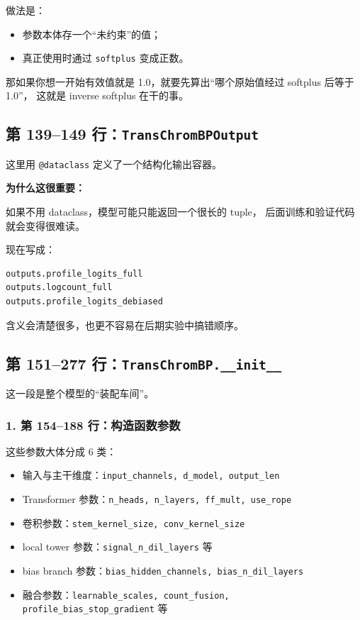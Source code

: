 \documentclass[11pt,a4paper]{ctexart}
\begin{document}
做法是：

\begin{itemize}[leftmargin=2em]
\item 参数本体存一个“未约束”的值；
\item 真正使用时通过 \texttt{softplus} 变成正数。
\end{itemize}

那如果你想一开始有效值就是 1.0，就要先算出“哪个原始值经过 softplus 后等于 1.0”，
这就是 inverse softplus 在干的事。

\subsection{第 139--149 行：\texttt{TransChromBPOutput}}

这里用 \texttt{@dataclass} 定义了一个结构化输出容器。

\textbf{为什么这很重要：}

如果不用 dataclass，模型可能只能返回一个很长的 tuple，
后面训练和验证代码就会变得很难读。

现在写成：

\begin{lstlisting}[language=Python]
outputs.profile_logits_full
outputs.logcount_full
outputs.profile_logits_debiased
\end{lstlisting}

含义会清楚很多，也更不容易在后期实验中搞错顺序。

\subsection{第 151--277 行：\texttt{TransChromBP.\_\_init\_\_}}

这一段是整个模型的“装配车间”。

\subsubsection*{1. 第 154--188 行：构造函数参数}

这些参数大体分成 6 类：

\begin{itemize}[leftmargin=2em]
\item 输入与主干维度：\texttt{input\_channels, d\_model, output\_len}
\item Transformer 参数：\texttt{n\_heads, n\_layers, ff\_mult, use\_rope}
\item 卷积参数：\texttt{stem\_kernel\_size, conv\_kernel\_size}
\item local tower 参数：\texttt{signal\_n\_dil\_layers} 等
\item bias branch 参数：\texttt{bias\_hidden\_channels, bias\_n\_dil\_layers}
\item 融合参数：\texttt{learnable\_scales, count\_fusion, profile\_bias\_stop\_gradient} 等
\end{itemize}
\end{document}
